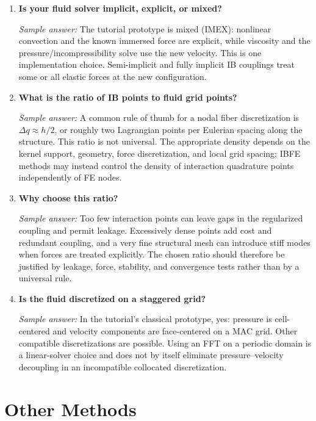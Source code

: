 \documentclass[11pt]{article}
\begin{document}
\begin{enumerate}[label=\arabic*.]

\item \textbf{Is your fluid solver implicit, explicit, or mixed?}

\textit{Sample answer:}  
The tutorial prototype is mixed (IMEX): nonlinear convection and the known immersed force are explicit, while viscosity and the pressure/incompressibility solve use the new velocity. This is one implementation choice. Semi-implicit and fully implicit IB couplings treat some or all elastic forces at the new configuration.

\item \textbf{What is the ratio of IB points to fluid grid points?}

\textit{Sample answer:}  
A common rule of thumb for a nodal fiber discretization is $\Delta q\approx h/2$, or roughly two Lagrangian points per Eulerian spacing along the structure. This ratio is not universal. The appropriate density depends on the kernel support, geometry, force discretization, and local grid spacing; IBFE methods may instead control the density of interaction quadrature points independently of FE nodes.

\item \textbf{Why choose this ratio?}

\textit{Sample answer:}  
Too few interaction points can leave gaps in the regularized coupling and permit leakage. Excessively dense points add cost and redundant coupling, and a very fine structural mesh can introduce stiff modes when forces are treated explicitly. The chosen ratio should therefore be justified by leakage, force, stability, and convergence tests rather than by a universal rule.

\item \textbf{Is the fluid discretized on a staggered grid?}

\textit{Sample answer:}  
In the tutorial's classical prototype, yes: pressure is cell-centered and velocity components are face-centered on a MAC grid. Other compatible discretizations are possible. Using an FFT on a periodic domain is a linear-solver choice and does not by itself eliminate pressure--velocity decoupling in an incompatible collocated discretization.

\end{enumerate}

\section*{Other Methods}
\end{document}
